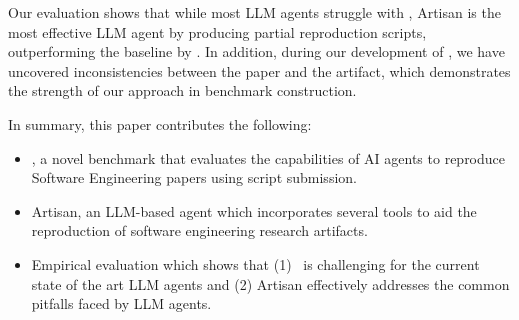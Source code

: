 Our evaluation shows that while most LLM agents struggle with \benchmark, Artisan is the most effective LLM agent by producing \artisanpartial{} partial reproduction scripts, outperforming the baseline by \artisanpartialoutperform{}.
In addition, during our development of \benchmark, we have uncovered \inconsistencies{} inconsistencies between the paper and the artifact, which demonstrates the strength of our approach in benchmark construction.

In summary, this paper contributes the following:
\begin{itemize}
    \item \benchmark, a novel benchmark that evaluates the capabilities of AI agents to reproduce Software Engineering papers using script submission.
    \item Artisan, an LLM-based agent which incorporates several tools to aid the reproduction of software engineering research artifacts.
    \item Empirical evaluation which shows that (1) \benchmark~is challenging for the current state of the art LLM agents and (2) Artisan effectively addresses the common pitfalls faced by LLM agents.
\end{itemize}
